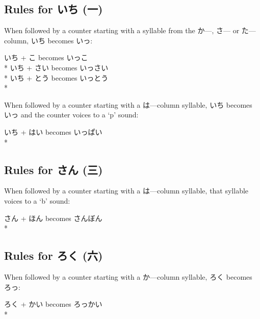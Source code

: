 \documentclass[11pt, b5paper, twoside, openright, onecolumn]{book}
\makeatletter
\newcommand*{\rubystack}[2]{{\relscale{0.5}%
  \begin{tabular}[b]{@{}c@{}}%
    {#1}\\%
   {\textscale{2}{#2}}%
  \end{tabular}}%
}
\DeclareRobustCommand*{\ruby}[2]{%
  \mbox{%
    \setlength{\parskip}{0ex}%
    \BeginAccSupp{method=pdfstringdef,ActualText={#1}}%
      \rubystack{\phantom{#2}}{#1}%
      \llap{%
        \rubystack{#2}{\phantom{#1}}%
      }%
    \EndAccSupp{}%
  }%
}
\renewcommand*{\ruby}[2]{#2 (#1)}%
\newenvironment{exampleblock}{
\setlength{\parindent}{0.6in}
\begin{minipage}[t]{\dimexpr\textwidth-\parindent}}
{\end{minipage}}
\makeatother
\begin{document}
\subsection{Rules for \ruby{一}{いち}}

When followed by a counter starting with a syllable from the か—‚ さ— or た—column‚ いち becomes いっ:

\vspace{0.4cm}
\begin{exampleblock}
いち + こ becomes いっこ \\* 
いち + さい becomes いっさい \\* 
いち + とう becomes いっとう \\* 
\end{exampleblock}
\vspace{0.2cm}

When followed by a counter starting with a は—column syllable‚ いち becomes いっ and the counter voices to a ‘p’ sound:

\vspace{0.4cm}
\begin{exampleblock}
いち + はい becomes いっぱい \\* 
\end{exampleblock}
\subsection{Rules for \ruby{三}{さん}}


When followed by a counter starting with a は—column syllable‚ that syllable voices to a ‘b’ sound:

\vspace{0.4cm}
\begin{exampleblock}
さん + ほん becomes さんぼん \\* 
\end{exampleblock}
\subsection{Rules for \ruby{六}{ろく}}


When followed by a counter starting with a か—column syllable‚ ろく becomes ろっ:

\vspace{0.4cm}
\begin{exampleblock}
ろく + かい becomes ろっかい \\* 
\end{exampleblock}
\vspace{0.2cm}
\end{document}
